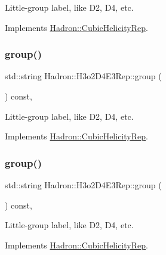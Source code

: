 Little-\/group label, like D2, D4, etc. 

Implements \mbox{\hyperlink{structHadron_1_1CubicHelicityRep_a101a7d76cd8ccdad0f272db44b766113}{Hadron\+::\+Cubic\+Helicity\+Rep}}.

\mbox{\label{structHadron_1_1H3o2D4E3Rep_acfb5a306823b56f4e03d1c7f818de23c}} 
\subsubsection{\texorpdfstring{group()}{group()}\hspace{0.1cm}{\footnotesize\ttfamily [3/5]}}
{\footnotesize\ttfamily std\+::string Hadron\+::\+H3o2\+D4\+E3\+Rep\+::group (\begin{DoxyParamCaption}{ }\end{DoxyParamCaption}) const\hspace{0.3cm}{\ttfamily [inline]}, {\ttfamily [virtual]}}

Little-\/group label, like D2, D4, etc. 

Implements \mbox{\hyperlink{structHadron_1_1CubicHelicityRep_a101a7d76cd8ccdad0f272db44b766113}{Hadron\+::\+Cubic\+Helicity\+Rep}}.

\mbox{\label{structHadron_1_1H3o2D4E3Rep_acfb5a306823b56f4e03d1c7f818de23c}} 
\subsubsection{\texorpdfstring{group()}{group()}\hspace{0.1cm}{\footnotesize\ttfamily [4/5]}}
{\footnotesize\ttfamily std\+::string Hadron\+::\+H3o2\+D4\+E3\+Rep\+::group (\begin{DoxyParamCaption}{ }\end{DoxyParamCaption}) const\hspace{0.3cm}{\ttfamily [inline]}, {\ttfamily [virtual]}}

Little-\/group label, like D2, D4, etc. 

Implements \mbox{\hyperlink{structHadron_1_1CubicHelicityRep_a101a7d76cd8ccdad0f272db44b766113}{Hadron\+::\+Cubic\+Helicity\+Rep}}.

